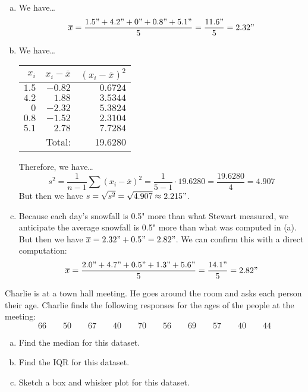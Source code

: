 \documentclass[11pt,letterpaper]{article}
\begin{document}
\sol 
\begin{enumerate}[(a)]
\item We have\dots
	\[
	\overline{x}= \dfrac{1.5" + 4.2" + 0" + 0.8" + 5.1"}{5}= \dfrac{11.6"}{5}= 2.32"
	\] \pspace

\item We have\dots \par
	\begin{table}[!ht]
	\centering
	\begin{tabular}{r|r|r}
	$x_i$ & $x_i - \overline{x}$ & $(x_i - \overline{x})^2$ \\ \hline
	$1.5$ & $-0.82$ & $0.6724$ \\
	$4.2$ & $1.88$ & $3.5344$ \\
	$0$ & $-2.32$ & $5.3824$ \\
	$0.8$ & $-1.52$ & $2.3104$ \\
	$5.1$ & $2.78$ & $7.7284$ \\ \hline
	& Total: & 19.6280
	\end{tabular}
	\end{table} \par
Therefore, we have\dots
	\[
	s^2= \dfrac{1}{n - 1} \sum (x_i - \overline{x})^2= \dfrac{1}{5 - 1} \cdot 19.6280= \dfrac{19.6280}{4}= 4.907
	\]
But then we have $s= \sqrt{s^2}= \sqrt{4.907} \approx 2.215"$. \pspace

\item Because each day's snowfall is 0.5" more than what Stewart measured, we anticipate the average snowfall is 0.5" more than what was computed in (a). But then we have $\overline{x}= 2.32" + 0.5"= 2.82"$. We can confirm this with a direct computation:
	\[
	\overline{x}= \dfrac{2.0" + 4.7" + 0.5" + 1.3" + 5.6"}{5}= \dfrac{14.1"}{5}= 2.82"
	\]
\end{enumerate}



\newpage



 Charlie is at a town hall meeting. He goes around the room and asks each person their age. Charlie finds the following responses for the ages of the people at the meeting:
	\[
	66 \qquad 50 \qquad 67 \qquad 40 \qquad 70 \qquad 56 \qquad 69 \qquad 57 \qquad 40 \qquad 44
	\]

\begin{enumerate}[(a)]
\item Find the median for this dataset. 
\item Find the IQR for this dataset.
\item Sketch a box and whisker plot for this dataset. 
\end{enumerate} \pspace
\end{document}
